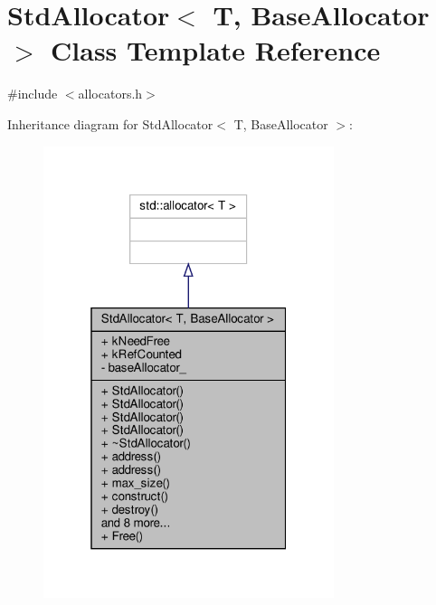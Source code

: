 \hypertarget{classStdAllocator}{}\section{Std\+Allocator$<$ T, Base\+Allocator $>$ Class Template Reference}
\label{classStdAllocator}


{\ttfamily \#include $<$allocators.\+h$>$}



Inheritance diagram for Std\+Allocator$<$ T, Base\+Allocator $>$\+:
\nopagebreak
\begin{figure}[H]
\begin{center}
\leavevmode
\includegraphics[width=241pt]{classStdAllocator__inherit__graph}
\end{center}
\end{figure}


